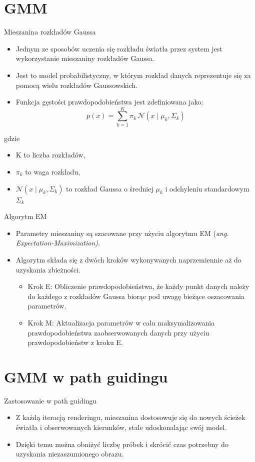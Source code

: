 \documentclass{beamer}
\begin{document}
\section{GMM}
\begin{frame}{Mieszanina rozkładów Gaussa}
\begin{itemize}
    \item Jednym ze sposobów uczenia się rozkładu światła przez system jest wykorzystanie mieszaniny rozkładów Gaussa.
    \item Jest to model probabilistyczny, w którym rozkład danych reprezentuje się za pomocą wielu rozkładów Gaussowskich.
    \item Funkcja gęstości prawdopodobieństwa jest zdefiniowana jako:
$$p(x) = \sum_{k=1}^{K} \pi_k \, \mathcal{N}(x \mid \mu_k, \Sigma_k)$$
\end{itemize}

gdzie
\begin{itemize}
    \item K to liczba rozkładów,
    \item $\pi_k$ to waga rozkładu,
    \item $\mathcal{N}(x \mid \mu_k, \Sigma_k)$ to rozkład Gaussa o średniej $\mu_k$ i odchyleniu standardowym $\Sigma_k$
\end{itemize}
\end{frame}

\begin{frame}{Algorytm EM}
\begin{itemize}
    \item Parametry mieszaniny są szacowane przy użyciu algorytmu EM (\it{ang. Expectation-Maximization}).
    \item \normalfont Algorytm składa się z dwóch kroków wykonywanych naprzemiennie aż do uzyskania zbieżności.
    \begin{itemize}
        \item Krok E: Obliczenie prawdopodobieństwa, że każdy punkt danych należy do każdego z rozkładów Gaussa biorąc pod uwagę bieżące oszacowania parametrów.
        \item Krok M: Aktualizacja parametrów w calu maksymalizowania prawdopodobieństwa zaobserwowanych danych przy użyciu prawdopodobieństw z kroku E.
    \end{itemize}
\end{itemize}
\end{frame}

\section{GMM w path guidingu}
\begin{frame}{Zastosowanie w path guidingu}
    \begin{itemize}
        \item Z każdą iteracją renderingu, mieszanina dostosowuje się do nowych ścieżek światła i obserwowanych kierunków, stale udoskonalając swój model.
        \item Dzięki temu można obniżyć liczbę próbek i skrócić czas potrzebny do uzyskania niezaszumionego obrazu.
    \end{itemize}
\end{frame}
\end{document}
